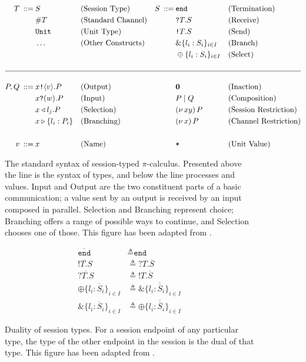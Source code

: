 \documentclass{l4proj}
\begin{document}
\begin{figure}[H]
\begin{align*}
T\:::=\:&S & &\text{(Session Type)} & S\:::=\:&\texttt{end} & &\text{(Termination)} \\
&\#T & &\text{(Standard Channel)} & &\texttt{?}T.S & &\text{(Receive)} \\
&\texttt{Unit} & &\text{(Unit Type)} & &\texttt{!}T.S & &\text{(Send)} \\
&\dots & &\text{(Other Constructs)} & &\&\{l_{i} : S_{i}\}_{i \in I} & &\text{(Branch)} \\
& & & & &\oplus\{l_{i} : S_{i}\}_{i \in I} & &\text{(Select)} \\
{} \\
\hline \\
P, Q\:::=\:&x\texttt{!} \langle v \rangle .P & &\text{(Output)} & & \textbf{0} & &\text{(Inaction)} \\
&x\texttt{?}(w).P & &\text{(Input)} & & P \mid Q & &\text{(Composition)} \\
&x \triangleleft l_{j}.P & &\text{(Selection)} & &(\nu\,xy)\,P & &\text{(Session Restriction)} \\
&x \triangleright \{l_{i}:P_{i}\} & &\text{(Branching)} & &(\nu\,x)\,P & &\text{(Channel Restriction)} \\
{} \\
v\:::=\:&x & &\text{(Name)} & & \texttt{*} & &\text{(Unit Value)}
\end{align*}
\caption{The standard syntax of session-typed $\pi$-calculus. Presented above the line is the syntax of types, and below the line processes and values. Input and Output are the two constituent parts of a basic communication; a value sent by an output is received by an input composed in parallel. Selection and Branching represent choice; Branching offers a range of possible ways to continue, and Selection chooses one of those. This figure has been adapted from \citet{DARDHA2017253}.}
\label{fig:sesSyntax}
\end{figure}

\begin{figure}[H]
\begin{align*}
\overline{\texttt{end}} &\triangleq \texttt{end} \\
\overline{\texttt{!}T.S} &\triangleq \texttt{?}T.\overline{S} \\
\overline{\texttt{?}T.S} &\triangleq \texttt{!}T.\overline{S} \\
\overline{\oplus\{l_{i}:S_{i}\}_{i \in I}} &\triangleq \overline{\&\{l_{i}:\overline{S}_{i}\}_{i \in I}} \\
\overline{\&\{l_{i}:S_{i}\}_{i \in I}} &\triangleq \overline{\oplus\{l_{i}:\overline{S}_{i}\}_{i \in I}}
\end{align*}
\caption{Duality of session types. For a session endpoint of any particular type, the type of the other endpoint in the session is the dual of that type. This figure has been adapted from \citet{DARDHA2017253}.}
\label{fig:sesDual}
\end{figure}
\end{document}
